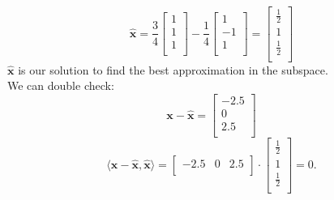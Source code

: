 \documentclass[12pt]{article}
\begin{document}
\begin{equation*}
    \hat{\mathbf{x}} = \frac{3}{4} 
    \begin{bmatrix}
        1 \\
        1 \\
        1 \\
    \end{bmatrix}
    - \frac{1}{4}
    \begin{bmatrix}
        1 \\
        -1 \\
        1 \\
    \end{bmatrix}
    =
    \begin{bmatrix}
        \frac{1}{2} \\
        1 \\
        \frac{1}{2} \\
    \end{bmatrix}
\end{equation*}
$\hat{\mathbf{x}} $ is our solution to find the best approximation in the subspace. \\
We can double check:
\begin{equation*}
    \mathbf{x} - \hat{\mathbf{x}} = 
    \begin{bmatrix}
        -2.5 \\
        0 \\
        2.5 \\
    \end{bmatrix}
\end{equation*}
\begin{equation*}
    \langle \mathbf{x} - \hat{\mathbf{x}}, \hat{\mathbf{x}} \rangle = 
    \begin{bmatrix}
        -2.5 &
        0 &
        2.5 \\
    \end{bmatrix} \cdot
    \begin{bmatrix}
        \frac{1}{2} \\
        1 \\
        \frac{1}{2} \\
    \end{bmatrix} = 
    0. 
\end{equation*}
\end{document}
